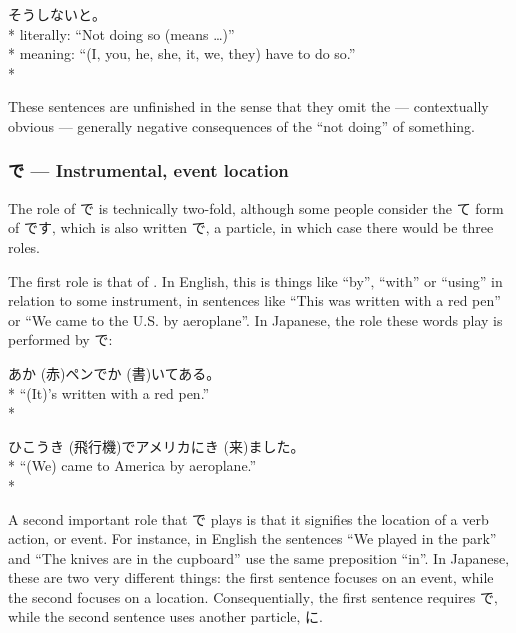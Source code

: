 \documentclass[11pt, b5paper, twoside, openright, onecolumn]{book}
\makeatletter
\newcommand*{\rubystack}[2]{{\relscale{0.5}%
  \begin{tabular}[b]{@{}c@{}}%
    {#1}\\%
   {\textscale{2}{#2}}%
  \end{tabular}}%
}
\DeclareRobustCommand*{\ruby}[2]{%
  \mbox{%
    \setlength{\parskip}{0ex}%
    \BeginAccSupp{method=pdfstringdef,ActualText={#1}}%
      \rubystack{\phantom{#2}}{#1}%
      \llap{%
        \rubystack{#2}{\phantom{#1}}%
      }%
    \EndAccSupp{}%
  }%
}
\renewcommand*{\ruby}[2]{#2 (#1)}%
\newenvironment{exampleblock}{
\setlength{\parindent}{0.6in}
\begin{minipage}[t]{\dimexpr\textwidth-\parindent}}
{\end{minipage}}
\makeatother
\begin{document}
\begin{exampleblock}
そうしないと。 \\* 
literally: “Not doing so (means …)” \\* 
meaning: “(I‚ you‚ he‚ she‚ it‚ we‚ they) have to do so.” \\* 
\end{exampleblock}
\vspace{0.2cm}

These sentences are unfinished in the sense that they omit the — contextually obvious — generally negative consequences of the “not doing” of something.

\subsubsection{で — Instrumental‚ event location}

The role of で is technically two-fold‚ although some people consider the て form of です‚ which is also written で‚ a particle‚ in which case there would be three roles.

The first role is that of . In English‚ this is things like “by”‚ “with” or “using” in relation to some instrument‚ in sentences like “This was written with a red pen” or “We came to the U.S. by aeroplane”. In Japanese‚ the role these words play is performed by で:

\vspace{0.4cm}
\begin{exampleblock}
\ruby{赤}{あか}ペンで\ruby{書}{か}いてある。 \\* 
“(It)’s written with a red pen.” \\* 
\end{exampleblock}
\vspace{0.2cm}

\begin{exampleblock}
\ruby{飛行機}{ひこうき}でアメリカに\ruby{来}{き}ました。 \\* 
“(We) came to America by aeroplane.” \\* 
\end{exampleblock}
\vspace{0.2cm}

A second important role that で plays is that it signifies the location of a verb action‚ or event. For instance‚ in English the sentences “We played in the park” and “The knives are in the cupboard” use the same preposition “in”. In Japanese‚ these are two very different things: the first sentence focuses on an event‚ while the second focuses on a location. Consequentially‚ the first sentence requires で‚ while the second sentence uses another particle‚ に.
\end{document}
